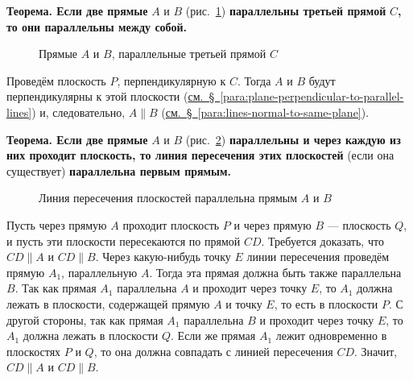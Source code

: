  \textbf{Теорема. Если две прямые} \(A\) и \(B\) (рис.~\ref{fig:kiselev-stereo-318}) \textbf{параллельны третьей прямой} \(C\)\textbf{, то они параллельны между собой.}

\begin{figure}[htbp]
    \centering
    \renewcommand{\thefigure}{318}
    \captionsetup{name=Рис.,labelsep=period}
    
    \caption{Прямые \(A\) и \(B\), параллельные третьей прямой \(C\)}\label{fig:kiselev-stereo-318}
\end{figure}

Проведём плоскость \(P\), перпендикулярную к \(C\). Тогда \(A\) и \(B\) будут перпендикулярны к этой плоскости (\hyperref[para:plane-perpendicular-to-parallel-lines]{см.~§~\ref*{para:plane-perpendicular-to-parallel-lines}}) и, следовательно, \(A\parallel B\) (\hyperref[para:lines-normal-to-same-plane]{см.~§~\ref*{para:lines-normal-to-same-plane}}).

 \textbf{Теорема. Если две прямые} \(A\) и \(B\) (рис.~\ref{fig:kiselev-stereo-319}) \textbf{параллельны и через каждую из них проходит плоскость, то линия пересечения этих плоскостей} (если она существует) \textbf{параллельна первым прямым.}

\begin{figure}[htbp]
    \centering
    \renewcommand{\thefigure}{319}
    \captionsetup{name=Рис.,labelsep=period}
    
    \caption{Линия пересечения плоскостей параллельна прямым \(A\) и \(B\)}\label{fig:kiselev-stereo-319}
\end{figure}

Пусть через прямую \(A\) проходит плоскость \(P\) и через прямую \(B\) --- плоскость \(Q\), и пусть эти плоскости пересекаются по прямой \(CD\). Требуется доказать, что \(CD\parallel A\) и \(CD\parallel B\). Через какую-нибудь точку \(E\) линии пересечения проведём прямую \(A_1\), параллельную \(A\). Тогда эта прямая должна быть также параллельна \(B\). Так как прямая \(A_1\) параллельна \(A\) и проходит через точку \(E\), то \(A_1\) должна лежать в плоскости, содержащей прямую \(A\) и точку \(E\), то есть в плоскости \(P\). С другой стороны, так как прямая \(A_1\) параллельна \(B\) и проходит через точку \(E\), то \(A_1\) должна лежать в плоскости \(Q\). Если же прямая \(A_1\) лежит одновременно в плоскостях \(P\) и \(Q\), то она должна совпадать с линией пересечения \(CD\). Значит, \(CD\parallel A\) и \(CD\parallel B\).


